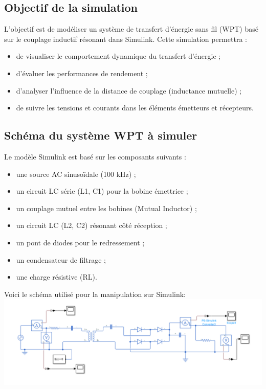 \documentclass[12pt,a4paper,titlepage,notitlepage]{article}
\begin{document}
	\subsection{Objectif de la simulation}
	
	L’objectif est de modéliser un système de transfert d’énergie sans fil (WPT) basé sur le couplage inductif résonant dans Simulink. Cette simulation permettra :
	
	\begin{itemize}
		\item de visualiser le comportement dynamique du transfert d’énergie ;
		\item d’évaluer les performances de rendement ;
		\item d’analyser l’influence de la distance de couplage (inductance mutuelle) ;
		\item de suivre les tensions et courants dans les éléments émetteurs et récepteurs.
	\end{itemize}
	
	\subsection{Schéma du système WPT à simuler}
	
	Le modèle Simulink est basé sur les composants suivants :
	\begin{itemize}
		\item une source AC sinusoïdale (100 kHz) ;
		\item un circuit LC série (L1, C1) pour la bobine émettrice ;
		\item un couplage mutuel entre les bobines (Mutual Inductor) ;
		\item un circuit LC (L2, C2) résonant côté réception ;
		\item un pont de diodes pour le redressement ;
		\item un condensateur de filtrage ;
		\item une charge résistive (RL).
	\end{itemize}
	
	Voici le schéma utilisé pour la manipulation sur Simulink:\\
	\includegraphics[width=1\textwidth]{WPT_simul}\\
	
\end{document}
